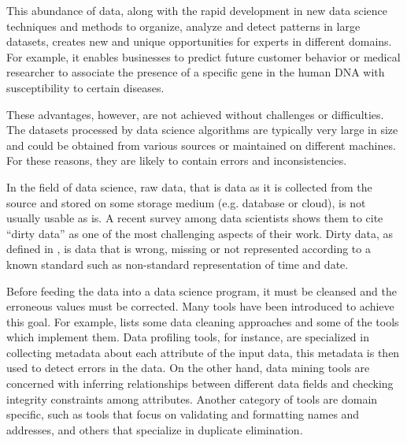 \documentclass[10pt]{report}
\begin{document}
This abundance of data, along with the rapid development in new data science techniques and methods to organize, analyze and detect patterns in large datasets, creates new and unique opportunities for experts in different domains. For example, it enables businesses to predict future customer behavior or medical researcher to associate the presence of a specific gene in the human DNA with susceptibility to certain diseases. 

These advantages, however, are not achieved without challenges or difficulties. The datasets processed by data science algorithms are typically very large in size and could be obtained from various sources or maintained on different machines. For these reasons, they are likely to contain errors and inconsistencies. 

In the field of data science, raw data, that is data as it is collected from the source and stored on some storage medium (e.g. database or cloud), is not usually usable as is. A recent survey among data scientists \cite{kaggle} shows them to cite ``dirty data'' as one of the most challenging aspects of their work. Dirty data, as defined in \cite{dirty-data}, is data that is wrong, missing or not represented according to a known standard such as non-standard representation of time and date.

Before feeding the data into a data science program, it must be cleansed and the erroneous values must be corrected. Many tools have been introduced to achieve this goal. For example, \cite{cleaning} lists some data cleaning approaches and some of the tools which implement them. Data profiling tools, for instance, are specialized in collecting metadata about each attribute of the input data, this metadata is then used to detect errors in the data. On the other hand, data mining tools are concerned with inferring relationships between different data fields and checking integrity constraints among attributes. Another category of tools are domain specific, such as tools that focus on validating and formatting names and addresses, and others that specialize in duplicate elimination.  
\end{document}

